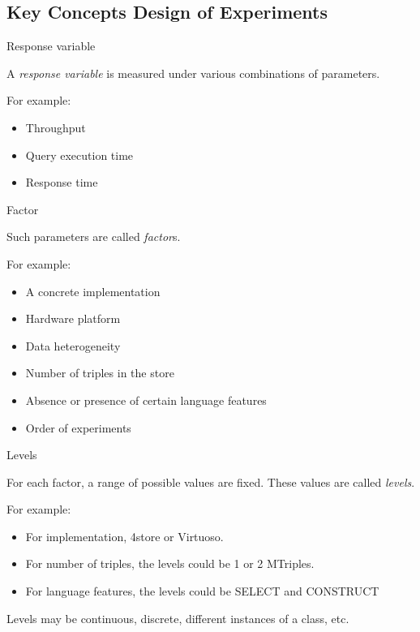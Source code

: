 \documentclass[english,handout,aspectratio=169]{ifislide}
\begin{document}
\subsection{Key Concepts Design of Experiments}

\begin{frame}{Response variable}

   A \emph{response variable} is measured under various
    combinations of parameters.

For example:
\begin{itemize}
\item Throughput
\item Query execution time
\item Response time
\end{itemize}

\end{frame}

\begin{frame}{Factor}

Such parameters are called \emph{factor}s. 

For example:
\begin{itemize}
\item A concrete implementation
\item Hardware platform
\item Data heterogeneity
\item Number of triples in the store
\item Absence or presence of certain language features
\item Order of experiments
\end{itemize}

\end{frame}

\begin{frame}{Levels}

For each factor, a range of possible values are fixed. These values
are called \emph{levels}.

For example:
\begin{itemize}
\item For implementation, 4store or Virtuoso.
\item For number of triples, the levels could be 1 or 2 MTriples.
\item For language features, the levels could be \textsf{SELECT} and \textsf{CONSTRUCT}
\end{itemize}

Levels may be continuous, discrete, different instances of a
class, etc.

\end{frame}
\end{document}

